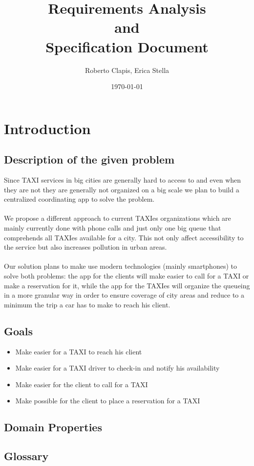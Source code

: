 \documentclass{article}
\author{Roberto Clapis, Erica Stella}
\date{\today}
\title{Requirements Analysis \\ and \\ Specification Document}
\begin{document}
\maketitle
\tableofcontents
\clearpage
\section{Introduction}
\subsection{Description of the given problem}
Since TAXI services in big cities are generally hard to access to and even when they are not they are generally not organized on a big scale we plan to build a centralized coordinating app to solve the problem. 
\\\\We propose a different approach to current TAXIes organizations which are mainly currently done with phone calls and just only one big queue that comprehends all TAXIes available for a city.
This not only affect accessibility to the service but also increases pollution in urban areas. 
\\\\Our solution plans to make use modern technologies (mainly smartphones) to solve both problems: the app for the clients will make easier to call for a TAXI or make a reservation for it, while the app for the TAXIes will organize the queueing in a more granular way in order to ensure coverage of city areas and reduce to a minimum the trip a car has to make to reach his client. 
\subsection{Goals}
\begin{itemize}
\item Make easier for a TAXI to reach his client
\item Make easier for a TAXI driver to check-in and notify his availability
\item Make easier for the client to call for a TAXI
\item Make possible for the client to place a reservation for a TAXI 
\end{itemize}
\subsection{Domain Properties}
\subsection{Glossary}
\end{document}
